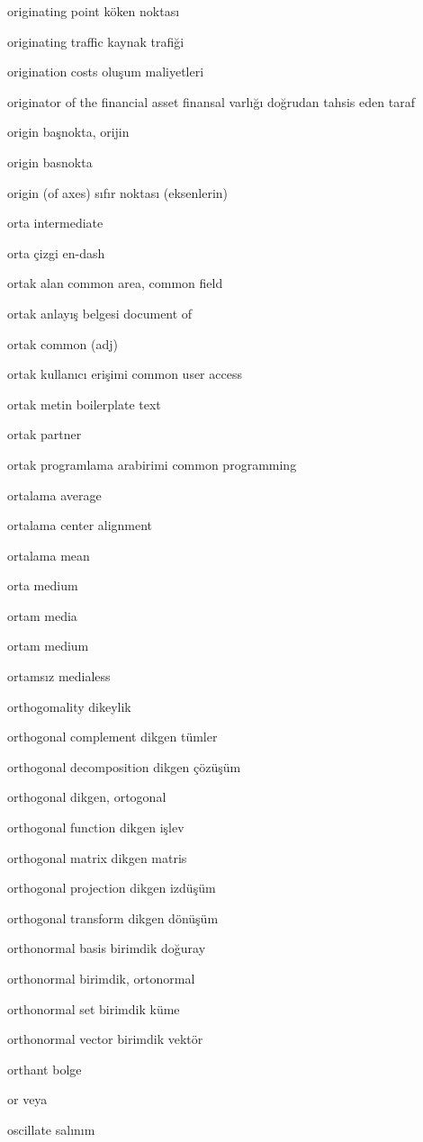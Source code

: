 \documentclass[12pt,fleqn]{article}\usepackage{../../common}
\begin{document}
originating point köken noktası

originating traffic kaynak trafiği

origination costs oluşum maliyetleri

originator of the financial asset finansal varlığı doğrudan tahsis eden taraf

origin başnokta, orijin

origin basnokta

origin (of axes) sıfır noktası (eksenlerin)

orta intermediate

orta çizgi en-dash

ortak alan common area, common field

ortak anlayış belgesi document of

ortak common (adj)

ortak kullanıcı erişimi common user access

ortak metin boilerplate text

ortak partner

ortak programlama arabirimi common programming

ortalama average

ortalama center alignment

ortalama mean

orta medium

ortam media

ortam medium

ortamsız medialess

orthogomality dikeylik

orthogonal complement dikgen tümler

orthogonal decomposition dikgen çözüşüm

orthogonal dikgen, ortogonal

orthogonal function dikgen işlev

orthogonal matrix dikgen matris

orthogonal projection dikgen izdüşüm

orthogonal transform dikgen dönüşüm

orthonormal basis birimdik doğuray

orthonormal birimdik, ortonormal

orthonormal set birimdik küme

orthonormal vector birimdik vektör

orthant bolge

or veya

oscillate salınım
\end{document}
